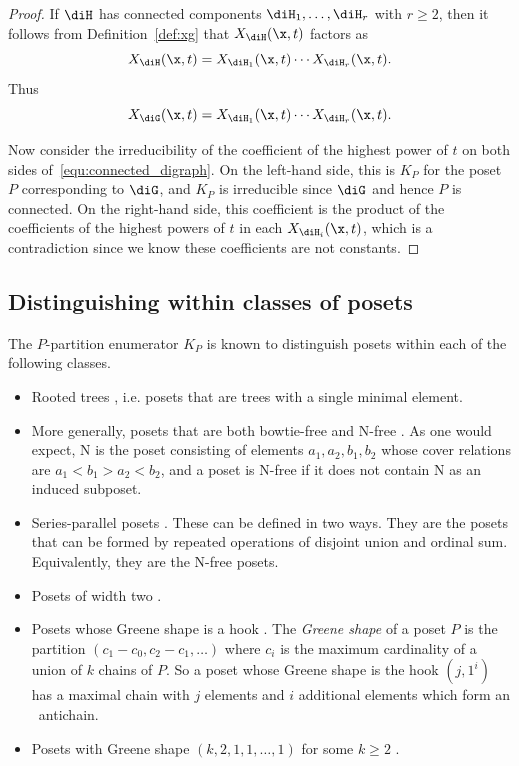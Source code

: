 \begin{proof}
If $\diH$ has connected components $\diH_1, \ldots, \diH_r$ with $r\geq 2$, then it follows from Definition~\ref{def:xg} that $X_{\diH}(\x,t)$ factors as 
\[
X_{\diH}(\x,t) = X_{\diH_1}(\x,t) \cdots X_{\diH_r}(\x,t).
\]
Thus
\begin{equation}\label{equ:connected_digraph}
X_{\diG}(\x,t) = X_{\diH_1}(\x,t) \cdots X_{\diH_r}(\x,t).
\end{equation}

Now consider the irreducibility of the coefficient of the highest power of $t$ on both sides of~\eqref{equ:connected_digraph}.  On the left-hand side, this is $K_P$ for the poset $P$ corresponding to $\diG$, and $K_P$ is irreducible since $\diG$ and hence $P$ is connected.  On the right-hand side, this coefficient is the product of the coefficients of the highest powers of $t$ in each $X_{\diH_i}(\x,t)$, which is a contradiction since we know these coefficients are not constants.  
\end{proof}

\subsection{Distinguishing within classes of posets}\label{sub:classes}

The $P$-partition enumerator $K_P$ is known to distinguish posets within each of the following classes.  
\begin{itemize}
\item Rooted trees \cite{HaTs17,Zho20+}, i.e. posets that are trees with a single minimal element.
\item More generally, posets that are both bowtie-free and \textsf{N}-free \cite{HaTs17}.  As one would expect, \textsf{N} is the poset consisting of elements $a_1,a_2,b_1,b_2$ whose cover relations are $a_1 < b_1 > a_2 < b_2$, and a poset is \textsf{N}-free if it does not contain \textsf{N} as an induced subposet.
\item Series-parallel posets \cite[Theorem~5.2]{LiWe21}.  These can be defined in two ways.  They are the posets that can be formed by repeated operations of disjoint union and ordinal sum.  Equivalently, they are the \textsf{N}-free posets. 
\item Posets of width two \cite{LiWe20}.
\item Posets whose Greene shape is a hook \cite{LiWe20}.  The \emph{Greene shape} of a poset $P$ is the partition $(c_1-c_0, c_2-c_1, \ldots)$ where $c_i$ is the maximum cardinality of a union of $k$ chains of $P$.  So a poset whose Greene shape is the hook $(j, 1^i)$ has a maximal chain with $j$ elements and $i$ additional elements which form an ~antichain. 
\item Posets with Greene shape $(k, 2, 1, 1, \ldots, 1)$ for some $k\geq2$ \cite{LiWe20}.
\end{itemize}


